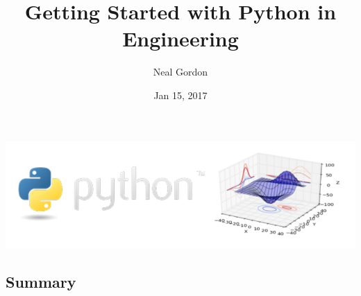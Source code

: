 \documentclass[%
oneside,                 %
final,                   %
10pt]{article}
\begin{document}






\title{{\color{seccolor} Getting Started with Python in Engineering}}


\author{Neal Gordon}


\date{Jan 15, 2017}
\maketitle

\centerline{\includegraphics[width=0.9\linewidth]{fig/pythonengineering.png}}



\subsection{Summary}
\end{document}
